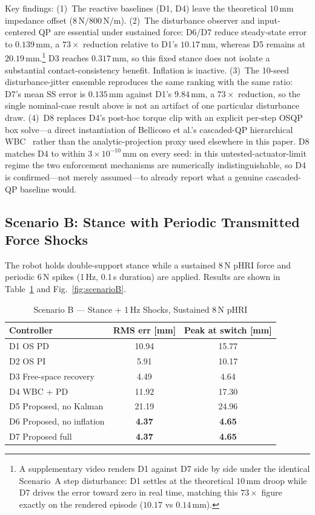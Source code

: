 Key findings: (1)~The reactive baselines (D1, D4) leave the theoretical
$10$\,mm impedance offset ($8\,\text{N}/800\,\text{N/m}$). (2)~The disturbance
observer and input-centered QP are essential under sustained force: D6/D7
reduce steady-state error to $0.139$\,mm, a $73\times$ reduction relative to
D1's $10.17$\,mm, whereas D5 remains at $20.19$\,mm.\footnote{A supplementary
video renders D1 against D7 side by side under the identical Scenario~A step
disturbance: D1 settles at the theoretical $10$\,mm droop while D7 drives the
error toward zero in real time, matching this $73\times$ figure exactly on
the rendered episode ($10.17$ vs $0.14$\,mm).}
D3 reaches $0.317$\,mm, so this fixed stance does not isolate a substantial
contact-consistency benefit. Inflation is inactive.
(3)~The 10-seed disturbance-jitter ensemble reproduces the same ranking with
the same ratio: D7's mean SS error is $0.135$\,mm against D1's $9.84$\,mm, a
$73\times$ reduction, so the single nominal-case result above is not an
artifact of one particular disturbance draw.
(4)~D8 replaces D4's post-hoc torque clip with an explicit per-step OSQP box
solve---a direct instantiation of Bellicoso et al.'s cascaded-QP hierarchical
WBC~\cite{bellicoso2016perception,bellicoso2019alma} rather than the
analytic-projection proxy used elsewhere in this paper. D8 matches D4 to
within $3\times10^{-10}$\,mm on every seed: in this untested-actuator-limit
regime the two enforcement mechanisms are numerically indistinguishable, so
D4 is confirmed---not merely assumed---to already report what a genuine
cascaded-QP baseline would.

\subsection{Scenario B: Stance with Periodic Transmitted Force Shocks}

The robot holds double-support stance while a sustained 8\,N pHRI force
and periodic 6\,N spikes (1\,Hz, 0.1\,s duration) are applied.
Results are shown in Table~\ref{tab:scenarioB} and Fig.~\ref{fig:scenarioB}.

\begin{table}[!t]
\caption{Scenario B --- Stance + 1\,Hz Shocks, Sustained 8\,N pHRI}
\label{tab:scenarioB}
\renewcommand{\arraystretch}{1.2}
\begin{tabular}{lcc}
\toprule
\textbf{Controller} & \textbf{RMS err [mm]} & \textbf{Peak at switch [mm]} \\
\midrule
D1 OS PD          & 10.94 & 15.77 \\
D2 OS PI          &  5.91 & 10.17 \\
D3 Free-space recovery & 4.49 & 4.64 \\
D4 WBC + PD         & 11.92 & 17.30 \\
D5 Proposed, no Kalman & 21.19 & 24.96 \\
D6 Proposed, no inflation & \textbf{4.37} & \textbf{4.65} \\
D7 Proposed full    & \textbf{4.37} & \textbf{4.65} \\
\bottomrule
\end{tabular}
\end{table}

